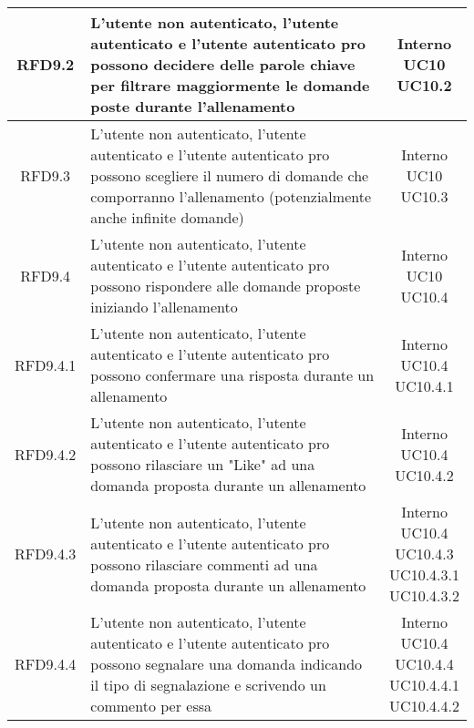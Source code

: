 \begin{longtable}{|c|>{\centering}m{7cm}|c|}
			 \hypertarget{{RFD9.2}}{{RFD9.2}} & L'utente non autenticato, l'utente autenticato e l'utente autenticato pro possono decidere delle parole chiave per filtrare maggiormente le domande poste durante l'allenamento & \makecell{Interno\\ UC10 \\UC10.2 } \\ \hline
			 \hypertarget{{RFD9.3}}{{RFD9.3}} & L'utente non autenticato, l'utente autenticato e l'utente autenticato pro possono scegliere il numero di domande che comporranno l'allenamento (potenzialmente anche infinite domande) & \makecell{Interno\\ UC10 \\UC10.3 } \\ \hline
			 \hypertarget{{RFD9.4}}{{RFD9.4}} & L'utente non autenticato, l'utente autenticato e l'utente autenticato pro possono rispondere alle domande proposte iniziando l'allenamento & \makecell{Interno\\ UC10 \\UC10.4 } \\ \hline
			 \hypertarget{{RFD9.4.1}}{{RFD9.4.1}} & L'utente non autenticato, l'utente autenticato e l'utente autenticato pro possono confermare una risposta durante un allenamento & \makecell{Interno\\ UC10.4 \\UC10.4.1 } \\ \hline
			 \hypertarget{{RFD9.4.2}}{{RFD9.4.2}} & L'utente non autenticato, l'utente autenticato e l'utente autenticato pro possono rilasciare un "Like" ad una domanda proposta durante un allenamento & \makecell{Interno\\ UC10.4 \\UC10.4.2 } \\ \hline
			 \hypertarget{{RFD9.4.3}}{{RFD9.4.3}} & L'utente non autenticato, l'utente autenticato e l'utente autenticato pro possono rilasciare commenti ad una domanda proposta durante un allenamento & \makecell{Interno\\ UC10.4 \\UC10.4.3 \\UC10.4.3.1 \\UC10.4.3.2 } \\ \hline
			 \hypertarget{{RFD9.4.4}}{{RFD9.4.4}} & L'utente non autenticato, l'utente autenticato e l'utente autenticato pro possono segnalare una domanda indicando il tipo di segnalazione e scrivendo un commento per essa & \makecell{Interno\\ UC10.4 \\UC10.4.4 \\UC10.4.4.1 \\UC10.4.4.2 } \\ \hline

\end{longtable}
